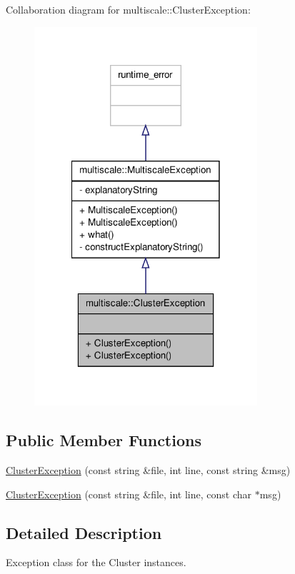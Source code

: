 Collaboration diagram for multiscale\-:\-:Cluster\-Exception\-:\nopagebreak
\begin{figure}[H]
\begin{center}
\leavevmode
\includegraphics[width=234pt]{classmultiscale_1_1ClusterException__coll__graph}
\end{center}
\end{figure}
\subsection*{Public Member Functions}
\begin{DoxyCompactItemize}
\item 
\hyperlink{classmultiscale_1_1ClusterException_a6acb6fc94c9bf4b78a0a3609a931d5d0}{Cluster\-Exception} (const string \&file, int line, const string \&msg)
\item 
\hyperlink{classmultiscale_1_1ClusterException_ab02aae52b2ace112ce68dadc06cfc1b8}{Cluster\-Exception} (const string \&file, int line, const char $\ast$msg)
\end{DoxyCompactItemize}


\subsection{Detailed Description}
Exception class for the Cluster instances. 

